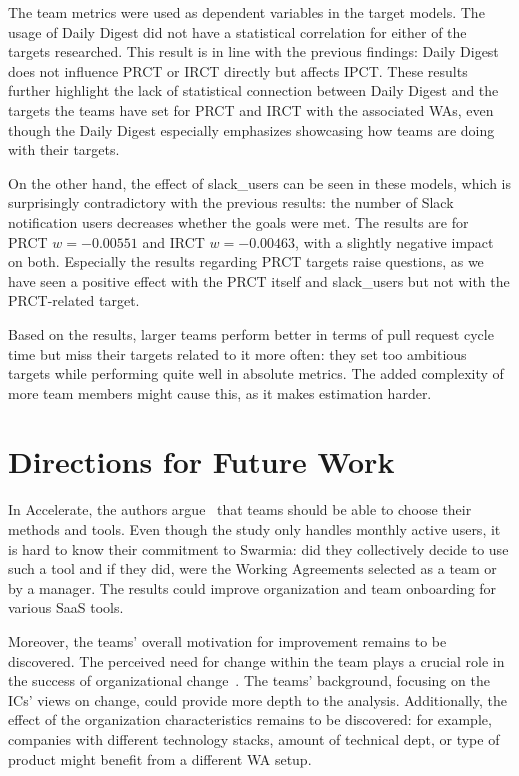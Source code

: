 The team metrics were used as dependent variables in the target models. The usage of Daily Digest did not have a statistical correlation for either of the targets researched. This result is in line with the previous findings: Daily Digest does not influence PRCT or IRCT directly but affects IPCT. These results further highlight the lack of statistical connection between Daily Digest and the targets the teams have set for PRCT and IRCT with the associated WAs, even though the Daily Digest especially emphasizes showcasing how teams are doing with their targets. 

On the other hand, the effect of slack\_users can be seen in these models, which is surprisingly contradictory with the previous results: the number of Slack notification users decreases whether the goals were met. The results are for PRCT $w=-0.00551$ and IRCT $w=-0.00463$, with a slightly negative impact on both. Especially the results regarding PRCT targets raise questions, as we have seen a positive effect with the PRCT itself and slack\_users but not with the PRCT-related target.

Based on the results, larger teams perform better in terms of pull request cycle time but miss their targets related to it more often: they set too ambitious targets while performing quite well in absolute metrics. The added complexity of more team members might cause this, as it makes estimation harder. 

\section{Directions for Future Work}

In Accelerate, the authors argue~\cite{forsgren_accelerate_2018} that teams should be able to choose their methods and tools. Even though the study only handles monthly active users, it is hard to know their commitment to Swarmia: did they collectively decide to use such a tool and if they did, were the Working Agreements selected as a team or by a manager. The results could improve organization and team onboarding for various SaaS tools. 

Moreover, the teams' overall motivation for improvement remains to be discovered. The perceived need for change within the team plays a crucial role in the success of organizational change~\cite{lenberg_initial_2017}. The teams' background, focusing on the ICs' views on change, could provide more depth to the analysis. Additionally, the effect of the organization characteristics remains to be discovered: for example, companies with different technology stacks, amount of technical dept, or type of product might benefit from a different WA setup.

